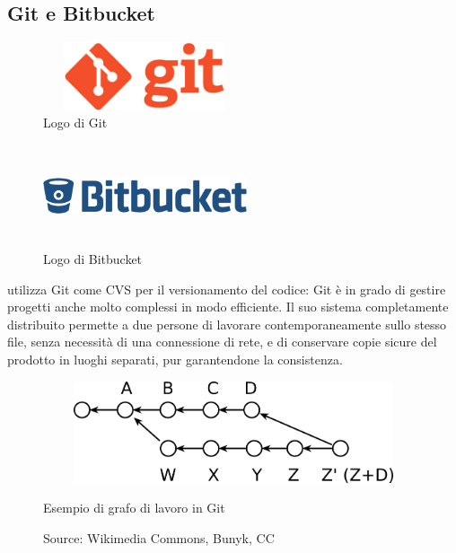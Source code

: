    \subsection{Git e Bitbucket}
   \begin{figure}[htbp]
      \begin{center}
         \includegraphics[width=6cm,height=2cm,keepaspectratio]{immagini/git-logo}
      \end{center}
      \caption{Logo di Git}\label{logogit}
   \end{figure}
   \begin{figure}[htbp]
      \begin{center}
         \includegraphics[width=6cm,height=3cm,keepaspectratio]{immagini/bitbucket-logo}
      \end{center}
      \caption{Logo di Bitbucket}\label{logobitbucket}
   \end{figure}
   \nomeAzienda{} utilizza Git come \gls{CVS} per il versionamento del codice: Git è in grado di gestire progetti anche molto complessi in modo efficiente. Il suo sistema completamente distribuito permette a due persone di lavorare contemporaneamente sullo stesso file, senza necessità di una connessione di rete, e di conservare copie sicure del prodotto in luoghi separati, pur garantendone la consistenza.\\
   \begin{figure}[htbp]
      \begin{center}
         \includegraphics[width=15cm,height=3cm,keepaspectratio]{immagini/git-branches}
      \end{center}
      \caption{Esempio di grafo di lavoro in Git}\label{grafogit}
      \caption*{Source: Wikimedia Commons, Bunyk, CC}
   \end{figure}
